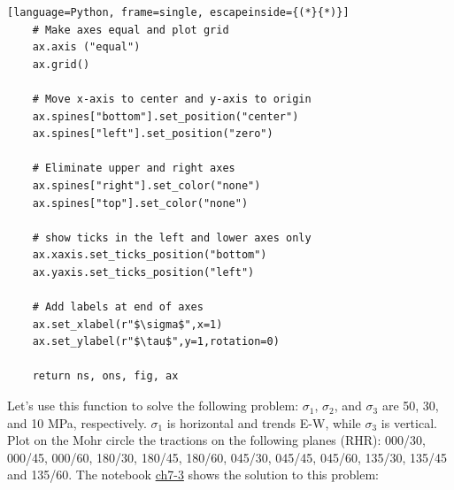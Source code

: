 \documentclass[a4paper , 12pt]{book}
\begin{document}
\begin{center}
\begin{lstlisting}[language=Python, frame=single, escapeinside={(*}{*)}]
	# Make axes equal and plot grid
	ax.axis ("equal")
	ax.grid()
	
	# Move x-axis to center and y-axis to origin
	ax.spines["bottom"].set_position("center")
	ax.spines["left"].set_position("zero")
	
	# Eliminate upper and right axes
	ax.spines["right"].set_color("none")
	ax.spines["top"].set_color("none")
	
	# show ticks in the left and lower axes only
	ax.xaxis.set_ticks_position("bottom")
	ax.yaxis.set_ticks_position("left")
	
	# Add labels at end of axes
	ax.set_xlabel(r"$\sigma$",x=1)
	ax.set_ylabel(r"$\tau$",y=1,rotation=0)
	
	return ns, ons, fig, ax
\end{lstlisting}
\end{center}

Let's use this function to solve the following problem: $\sigma_1$, $\sigma_2$, and $\sigma_3$ are 50, 30, and 10 MPa, respectively. $\sigma_1$ is horizontal and trends E-W, while $\sigma_3$ is vertical. Plot on the Mohr circle the tractions on the following planes (RHR): 000/30, 000/45, 000/60, 180/30, 180/45, 180/60, 045/30, 045/45, 045/60, 135/30, 135/45 and 135/60. The notebook \href{https://github.com/nfcd/compGeo/blob/master/source/notebooks/ch7-3.ipynb}{ch7-3} shows the solution to this problem:
\end{document}
